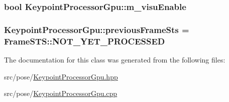 \subsubsection[{\texorpdfstring{m\+\_\+visu\+Enable}{m_visuEnable}}]{\setlength{\rightskip}{0pt plus 5cm}bool Keypoint\+Processor\+Gpu\+::m\+\_\+visu\+Enable\hspace{0.3cm}{\ttfamily [private]}}\hypertarget{classKeypointProcessorGpu_a31a0d88cbd1aec736eb30e97413b9247}{}\label{classKeypointProcessorGpu_a31a0d88cbd1aec736eb30e97413b9247}
\subsubsection[{\texorpdfstring{previous\+Frame\+Sts}{previousFrameSts}}]{ Keypoint\+Processor\+Gpu\+::previous\+Frame\+Sts = {\bf Frame\+S\+T\+S\+::\+N\+O\+T\+\_\+\+Y\+E\+T\+\_\+\+P\+R\+O\+C\+E\+S\+S\+ED}\hspace{0.3cm}{\ttfamily [private]}}\hypertarget{classKeypointProcessorGpu_a298b81730df9cce6b59b0fc35ba1c865}{}\label{classKeypointProcessorGpu_a298b81730df9cce6b59b0fc35ba1c865}


The documentation for this class was generated from the following files\+:\begin{DoxyCompactItemize}
\item 
src/pose/\hyperlink{KeypointProcessorGpu_8hpp}{Keypoint\+Processor\+Gpu.\+hpp}\item 
src/pose/\hyperlink{KeypointProcessorGpu_8cpp}{Keypoint\+Processor\+Gpu.\+cpp}\end{DoxyCompactItemize}

